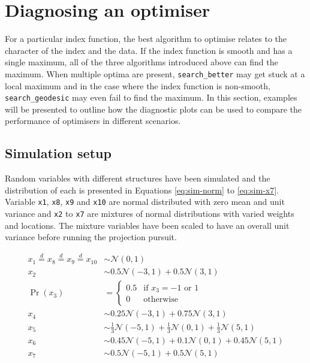 \hypertarget{application}{%
\section{Diagnosing an optimiser}\label{application}}

For a particular index function, the best algorithm to optimise relates to the character of the index and the data. If the index function is smooth and has a single maximum, all of the three algorithms introduced above can find the maximum. When multiple optima are present, \texttt{search\_better} may get stuck at a local maximum and in the case where the index function is non-smooth, \texttt{search\_geodesic} may even fail to find the maximum. In this section, examples will be presented to outline how the diagnostic plots can be used to compare the performance of optimisers in different scenarios.

\hypertarget{simulation-setup}{%
\subsection{Simulation setup}\label{simulation-setup}}

Random variables with different structures have been simulated and the distribution of each is presented in Equations \ref{eq:sim-norm} to \ref{eq:sim-x7}. Variable \texttt{x1}, \texttt{x8}, \texttt{x9} and \texttt{x10} are normal distributed with zero mean and unit variance and \texttt{x2} to \texttt{x7} are mixtures of normal distributions with varied weights and locations. The mixture variables have been scaled to have an overall unit variance before running the projection pursuit.

\begin{align}
x_1 \overset{d}{=} x_8 \overset{d}{=} x_9 \overset{d}{=} x_{10}& \sim \mathcal{N}(0, 1) \label{eq:sim-norm} \\
x_2 &\sim 0.5 \mathcal{N}(-3, 1) + 0.5 \mathcal{N}(3, 1)\label{eq:sim-x2}\\
\Pr(x_3) &= 
\begin{cases}
0.5 & \text{if $x_3 = -1$ or $1$}\\
0 & \text{otherwise}
\end{cases}\label{eq:sim-x3}\\
x_4 &\sim 0.25 \mathcal{N}(-3, 1) + 0.75 \mathcal{N}(3, 1) \label{eq:sim-x4}\\
x_5 &\sim \frac{1}{3} \mathcal{N}(-5, 1) + \frac{1}{3} \mathcal{N}(0, 1) + \frac{1}{3} \mathcal{N}(5, 1)\label{eq:sim-x5}\\
x_6 &\sim 0.45 \mathcal{N}(-5, 1) + 0.1 \mathcal{N}(0, 1) + 0.45 \mathcal{N}(5, 1)\label{eq:sim-x6}\\
x_7 &\sim 0.5 \mathcal{N}(-5, 1) + 0.5 \mathcal{N}(5, 1) 
\label{eq:sim-x7}
\end{align}

